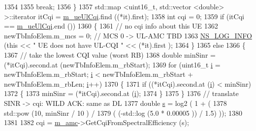 \begin{DoxyCode}
1354 
1355                         \textcolor{keywordflow}{break};
1356                 \}
1357                 std::map <uint16\_t, std::vector <double> >::iterator itCqi = 
      \hyperlink{classns3_1_1MmWaveRrMacScheduler_aeb890d54a9f369fe677a64efa78d2402}{m\_ueUlCqi}.find ((*it).first);
1358                 \textcolor{keywordtype}{int} cqi = 0;
1359                 \textcolor{keywordflow}{if} (itCqi == \hyperlink{classns3_1_1MmWaveRrMacScheduler_aeb890d54a9f369fe677a64efa78d2402}{m\_ueUlCqi}.end ())
1360                 \{
1361                         \textcolor{comment}{// no cqi info about this UE}
1362                         newTbInfoElem.m\_mcs = 0; \textcolor{comment}{// MCS 0 -> UL-AMC TBD}
1363                         \hyperlink{group__logging_gafbd73ee2cf9f26b319f49086d8e860fb}{NS\_LOG\_INFO} (\textcolor{keyword}{this} << \textcolor{stringliteral}{" UE does not have UL-CQI "} << (*it).first );
1364                 \}
1365                 \textcolor{keywordflow}{else}
1366                 \{
1367                         \textcolor{comment}{// take the lowest CQI value (worst RB)}
1368                         \textcolor{keywordtype}{double} minSinr = (*itCqi).second.at (newTbInfoElem.m\_rbStart);
1369                         \textcolor{keywordflow}{for} (uint16\_t \hyperlink{bernuolliDistribution_8m_a6f6ccfcf58b31cb6412107d9d5281426}{i} = newTbInfoElem.m\_rbStart; \hyperlink{bernuolliDistribution_8m_a6f6ccfcf58b31cb6412107d9d5281426}{i} < newTbInfoElem.m\_rbStart + 
      newTbInfoElem.m\_rbLen; \hyperlink{bernuolliDistribution_8m_a6f6ccfcf58b31cb6412107d9d5281426}{i}++)
1370                         \{
1371                                 \textcolor{keywordflow}{if} ((*itCqi).second.at (\hyperlink{bernuolliDistribution_8m_a6f6ccfcf58b31cb6412107d9d5281426}{i}) < minSinr)
1372                                 \{
1373                                         minSinr = (*itCqi).second.at (\hyperlink{bernuolliDistribution_8m_a6f6ccfcf58b31cb6412107d9d5281426}{i});
1374                                 \}
1375                         \}
1376                         \textcolor{comment}{// translate SINR -> cqi: WILD ACK: same as DL}
1377                         \textcolor{keywordtype}{double} \hyperlink{generate__test__data__lte__sinr_8m_ad83eeb3a142285d1243a08c6b7026df8}{s} = log2 ( 1 + (
1378                                         std::pow (10, minSinr / 10 )  /
1379                                         ( (-std::log (5.0 * 0.00005 )) / 1.5) ));
1380 
1381 
1382                         cqi = \hyperlink{classns3_1_1MmWaveRrMacScheduler_abbcdddd7d8733f372963069e1d0395d3}{m\_amc}->GetCqiFromSpectralEfficiency (s);

\end{DoxyCode}
